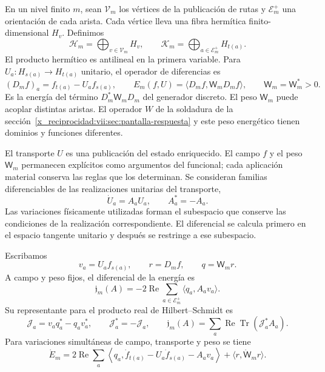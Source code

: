 En un nivel finito \(m\), sean \(\mathcal V_m\) los vértices de la
publicación de rutas y \(\mathcal E_m^+\) una orientación de cada arista.
Cada vértice lleva una fibra hermítica finito-dimensional \(H_v\).
Definimos
\[
 \mathcal H_m=\bigoplus_{v\in\mathcal V_m}H_v,\qquad
 \mathcal K_m=\bigoplus_{a\in\mathcal E_m^+}H_{t(a)}.
\]
El producto hermítico es antilineal en la primera variable.
Para \(U_a:H_{s(a)}\to H_{t(a)}\) unitario, el operador de diferencias es
\begin{equation}
 (D_mf)_a=f_{t(a)}-U_af_{s(a)},\qquad
 E_m(f,U)=\langle D_mf,\mathsf W_mD_mf\rangle,\qquad
 \mathsf W_m=\mathsf W_m^*>0.
 \label{x_reciprocidad:vii:eq:energia-memoria-discreta}
\end{equation}
Es la energía del término \(D_m^*\mathsf W_mD_m\) del generador discreto.
El peso \(\mathsf W_m\) puede acoplar distintas aristas. El operador \(W\)
de la soldadura de la sección~\ref{x_reciprocidad:vii:sec:pantalla-respuesta} y este peso
energético tienen dominios y funciones diferentes.

El transporte \(U\) es una publicación del estado enriquecido. El campo
\(f\) y el peso \(\mathsf W_m\) permanecen explícitos como argumentos
del funcional; cada aplicación material conserva las reglas que los
determinan. Se consideran familias diferenciables de las realizaciones
unitarias del transporte,
\[
 \dot U_a=A_aU_a,\qquad A_a^*=-A_a.
\]
Las variaciones físicamente utilizadas forman el subespacio que conserve
las condiciones de la realización correspondiente. El diferencial se
calcula primero en el espacio tangente unitario y después se restringe
a ese subespacio.

\begin{proposition}
\label{x_reciprocidad:vii:prop:covector-memoria}
Escribamos
\[
 v_a=U_af_{s(a)},\qquad r=D_mf,\qquad q=\mathsf W_mr.
\]
A campo y peso fijos, el diferencial de la energía es
\begin{equation}
 \mathfrak j_m(A)=-2\operatorname{Re}
       \sum_{a\in\mathcal E_m^+}\langle q_a,A_av_a\rangle .
 \label{x_reciprocidad:vii:eq:covector-memoria}
\end{equation}
Su representante para el producto real de Hilbert--Schmidt es
\begin{equation}
 \mathcal J_a=v_aq_a^*-q_av_a^*,\qquad
 \mathcal J_a^*=-\mathcal J_a,\qquad
 \mathfrak j_m(A)=
 \sum_a\operatorname{Re}\operatorname{Tr}(\mathcal J_a^*A_a).
 \label{x_reciprocidad:vii:eq:representante-corriente-discreta}
\end{equation}
Para variaciones simultáneas de campo, transporte y peso se tiene
\begin{equation}
 \dot E_m=
 2\operatorname{Re}\sum_a
 \left\langle q_a,\dot f_{t(a)}-U_a\dot f_{s(a)}-A_av_a\right\rangle
 +\langle r,\dot{\mathsf W}_mr\rangle .
 \label{x_reciprocidad:vii:eq:variacion-completa-memoria}
\end{equation}
\end{proposition}


